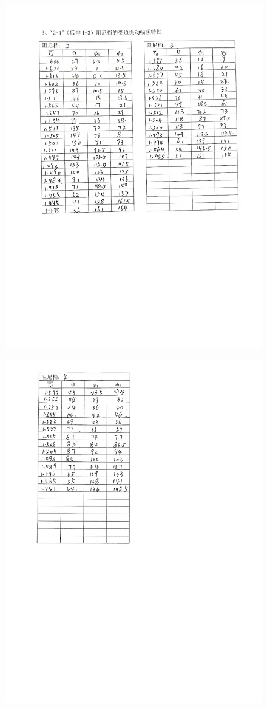 \documentclass[UTF8]{ctexart}
\begin{document}
\begin{figure}[H]
    \centering
    \includegraphics[scale=0.15]{原始数据2.jpg}
\end{figure}
\begin{figure}[H]
    \centering
    \includegraphics[scale=0.12]{原始数据3.jpg}

\end{figure}
\end{document}
